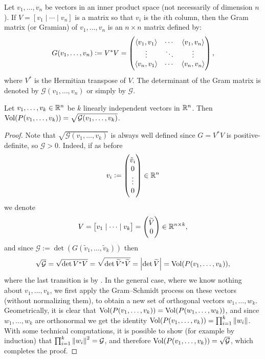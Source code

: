 \documentclass[11pt,a4paper]{article}
\begin{document}
\begin{definition}
  Let $v_1,\dots,v_n$ be vectors in an inner product space
  (not necessarily of dimension $n$).
  If $V = \left[v_1 \mid \cdots \mid v_n\right]$ is a matrix
  so that $v_i$ is the $i$th column, then the Gram matrix
  (or Gramian) of $v_1,\dots,v_n$ is an $n \times n$ matrix defined by:
  \[
    G(v_1,\dots,v_n) :=
    V^* V =
    \begin{pmatrix}
      \left\langle v_1, v_1 \right\rangle & \cdots & \left\langle v_1, v_n \right\rangle \\
      \vdots & \ddots & \vdots \\
      \left\langle v_n, v_1 \right\rangle & \cdots & \left\langle v_n, v_n \right\rangle
    \end{pmatrix},
  \]
  where $V^*$ is the Hermitian transpose of $V$.
  The determinant of the Gram matrix is denoted by
  $\mathcal G(v_1,\dots,v_n)$ or simply by $\mathcal G$.
\end{definition}

\begin{proposition}
  Let $v_1,\dots,v_k \in \mathbb{R}^n$ be $k$ linearly independent vectors in $\mathbb{R}^n$.
  Then $\operatorname{Vol}(P(v_1,\dots,v_k)) = \sqrt{\mathcal G(v_1,\dots,v_k)}$.
\end{proposition}
\begin{proof}
  Note that $\sqrt{\mathcal G(v_1,\dots,v_k)}$ is always well defined
  since $G = V^*V$ is positive-definite, so $\mathcal G > 0$.
  Indeed, if as before
  \[
    v_i :=
    \begin{pmatrix} \tilde v_i \\ 0 \\ \vdots \\ 0 \end{pmatrix} \in \mathbb{R}^n
  \]
  we denote
  \[
    V = \left[v_1 \mid \cdots \mid v_k\right] =
    \begin{pmatrix} \widetilde V \\ 0 \end{pmatrix} \in \mathbb{R}^{n \times k},
  \]
  and since $\mathcal G := \det(G(\tilde v_1,\dots,\tilde v_k))$ then
  \[
    \sqrt{\mathcal G} =
    \sqrt{\det V^* V} =
    \sqrt{\det\widetilde V^* \widetilde V} =
    \left\lvert\det \widetilde V\right\rvert =
    \operatorname{Vol}(P(v_1,\dots,v_k)),
  \]
  where the last transition is by .
  In the general case, where we know nothing about $v_1,\dots,v_k$,
  we first apply the Gram--Schmidt process on these vectors
  (without normalizing them), to obtain a new set of orthogonal
  vectors $w_1,\dots,w_k$.
  Geometrically, it is clear
  that $\operatorname{Vol}(P(v_1,\dots,v_k)) = \operatorname{Vol}(P(w_1,\dots,w_k))$,
  and since $w_1,\dots,w_k$ are orthonormal we get the identity
  $\operatorname{Vol}(P(v_1,\dots,v_k)) = \prod_{i=1}^{k} \left\lVert w_i\right\rVert$.
  With some technical computations,
  it is possible to show (for example by induction) that
  $\prod_{i=1}^{k} \left\lVert w_i\right\rVert^2 = \mathcal G$,
  and therefore $\operatorname{Vol}(P(v_1,\dots,v_k)) = \sqrt{\mathcal G}$,
  which completes the proof.
\end{proof}
\end{document}
